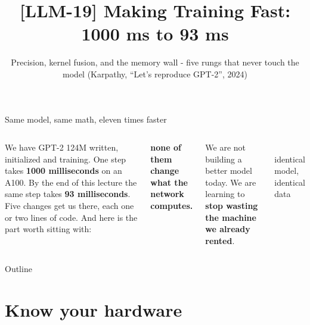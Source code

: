 \documentclass[aspectratio=169]{beamer}
\title{[LLM-19] Making Training Fast: 1000 ms to 93 ms}
\subtitle{Precision, kernel fusion, and the memory wall - five rungs that never touch the model \quad(Karpathy, ``Let's reproduce GPT-2'', 2024)}
\date{}
\begin{document}
\begin{frame}{Same model, same math, eleven times faster}
  \begin{columns}[T]
    We have GPT-2 124M written, initialized and training. One step takes
    \textbf{1000 milliseconds} on an A100.
    \vskip 5pt
    By the end of this lecture the same step takes \textbf{93 milliseconds}.
    \vskip 5pt
    Five changes get us there, each one or two lines of code. And here is the part
    worth sitting with:
    \vskip 4pt
    \begin{center}
      {\color{popblue}\bfseries none of them change what the network computes.}
    \end{center}
    \vskip 4pt
    We are not building a better model today. We are learning to \textbf{stop wasting
    the machine we already rented}.
    \begin{center}
      \\[6pt]
      {\scriptsize identical model, identical data}
    \end{center}
  \end{columns}
\end{frame}

\begin{frame}{Outline}
  \tableofcontents
\end{frame}

\section{Know your hardware}
\end{document}

